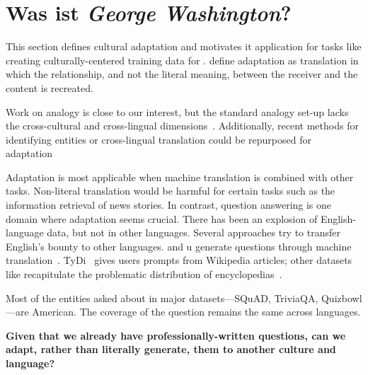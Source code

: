 \section{Was ist \textit{ George Washington}?}
\label{sec:motivation}

This section defines cultural adaptation and motivates it application for tasks
like creating culturally-centered training data for .
%
\citet{vinay1995comparative} define adaptation as translation in which the relationship, and not the literal meaning, between the receiver and the content is recreated.

Work on analogy is close to our interest, but the standard analogy set-up lacks the cross-cultural and cross-lingual dimensions~\citep{turney2008uniform, gladkova-etal-2016-analogy}.
%
Additionally, recent methods for identifying entities or cross-lingual
translation could be repurposed for adaptation~\citep{duh2011machine,
	schnabel2015evaluation, kasai-etal-2019-low,
	arora-etal-2019-semi, kim-etal-2019-effective,
	hangya-fraser-2019-unsupervised}

Adaptation is most applicable when machine translation is combined
with other tasks.
%
Non-literal translation would be harmful for certain tasks such as the information retrieval of news stories.
%
In contrast, question answering is one domain where adaptation seems crucial.
%
There has been an explosion of English-language  data,
but not in other languages.  
%
Several approaches try to transfer English's bounty to other
languages.
%
 and u generate questions through machine
translation~\citep{lewis2019mlqa, 2019xquad}.
%
TyDi~\citep{tydiqa} gives users prompts from Wikipedia articles; other
datasets like \squad{} recapitulate the problematic distribution of
encyclopedias~\citep{reagle-11}.

Most of the entities asked about in major 
datasets---SQuAD, TriviaQA, Quizbowl---are American.
%
The coverage of the question remains the same across languages.

\textbf{ Given that we already have professionally-written questions,
	can we \textbf{adapt}, rather than literally generate, them to another culture and language?  }